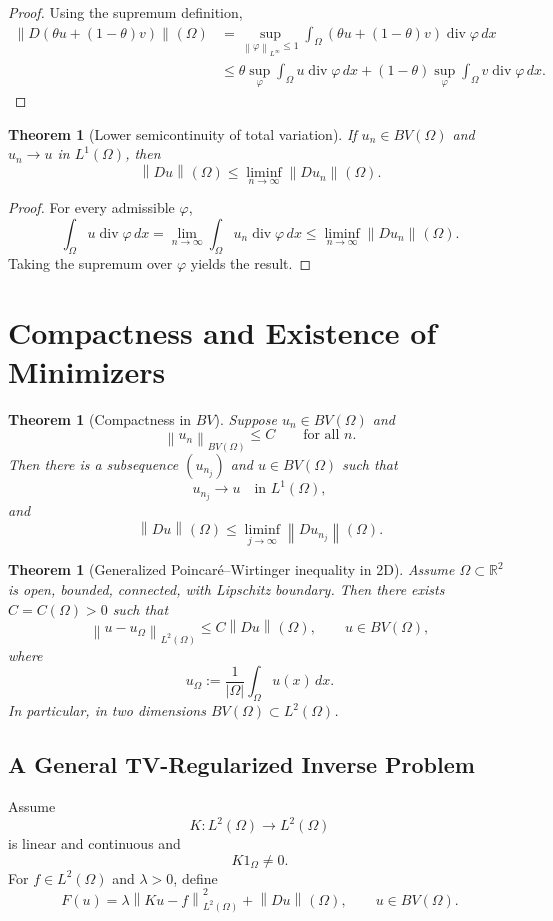 \documentclass[11pt]{article}
\newcommand{\Om}{\Omega}
\newcommand{\R}{\mathbb{R}}
\newcommand{\Div}{\operatorname{div}}
\newcommand{\norm}[2][]{\left\lVert #2\right\rVert_{#1}}
\theoremstyle{definition}
\theoremstyle{plain}
\newtheorem{theorem}[definition]{Theorem}
\begin{document}
\begin{proof}
Using the supremum definition,
\begin{align*}
\norm{D(\theta u+(1-\theta)v)}(\Om)
&=\sup_{\norm[L^\infty]{\varphi}\le1}
\int_{\Om}(\theta u+(1-\theta)v)\Div\varphi\,dx\\
&\le \theta\sup_{\varphi}\int_{\Om}u\Div\varphi\,dx
+(1-\theta)\sup_{\varphi}\int_{\Om}v\Div\varphi\,dx.
\end{align*}
\end{proof}

\begin{theorem}[Lower semicontinuity of total variation]
If $u_n\in BV(\Om)$ and $u_n\to u$ in $L^1(\Om)$, then
\[
\norm{Du}(\Om)\le \liminf_{n\to\infty}\norm{Du_n}(\Om).
\]
\end{theorem}

\begin{proof}
For every admissible $\varphi$,
\[
\int_{\Om}u\Div\varphi\,dx
=\lim_{n\to\infty}\int_{\Om}u_n\Div\varphi\,dx
\le \liminf_{n\to\infty}\norm{Du_n}(\Om).
\]
Taking the supremum over $\varphi$ yields the result.
\end{proof}

\section{Compactness and Existence of Minimizers}

\begin{theorem}[Compactness in $BV$]
Suppose $u_n\in BV(\Om)$ and
\[
\norm[BV(\Om)]{u_n}\le C\qquad\text{for all }n.
\]
Then there is a subsequence $(u_{n_j})$ and $u\in BV(\Om)$ such that
\[
u_{n_j}\to u\quad\text{in }L^1(\Om),
\]
and
\[
\norm{Du}(\Om)
\le \liminf_{j\to\infty}\norm{Du_{n_j}}(\Om).
\]
\end{theorem}

\begin{theorem}[Generalized Poincar\'e--Wirtinger inequality in 2D]
Assume $\Om\subset\R^2$ is open, bounded, connected, with Lipschitz boundary. Then there exists $C=C(\Om)>0$ such that
\[
\norm[L^2(\Om)]{u-u_{\Om}}
\le C\norm{Du}(\Om),
\qquad u\in BV(\Om),
\]
where
\[
u_{\Om}:=\frac{1}{|\Om|}\int_{\Om}u(x)\,dx.
\]
In particular, in two dimensions $BV(\Om)\subset L^2(\Om)$.
\end{theorem}

\subsection{A General TV-Regularized Inverse Problem}
Assume
\[
K:L^2(\Om)\to L^2(\Om)
\]
is linear and continuous and
\[
K1_{\Om}\neq0.
\]
For $f\in L^2(\Om)$ and $\lambda>0$, define
\[
F(u)=\lambda\norm[L^2(\Om)]{Ku-f}^2+\norm{Du}(\Om),
\qquad u\in BV(\Om).
\]
\end{document}
